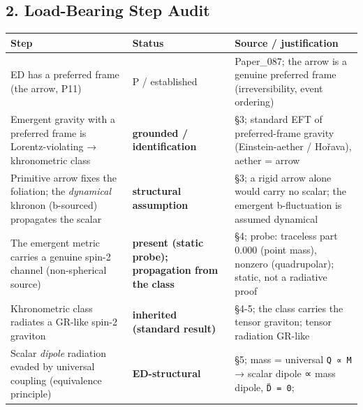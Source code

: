 \documentclass[
]{article}
\newcounter{none} %
\begin{document}
\subsection{2. Load-Bearing Step Audit}\label{load-bearing-step-audit}

{\def\LTcaptype{none} %
\begin{longtable}[]{@{}
  >{\raggedright\arraybackslash}p{}
  >{\raggedright\arraybackslash}p{}
  >{\raggedright\arraybackslash}p{}@{}}
\toprule\noalign{}
\begin{minipage}[b]{\linewidth}\raggedright
Step
\end{minipage} & \begin{minipage}[b]{\linewidth}\raggedright
Status
\end{minipage} & \begin{minipage}[b]{\linewidth}\raggedright
Source / justification
\end{minipage} \\
\midrule\noalign{}
\endhead
\bottomrule\noalign{}
\endlastfoot
ED has a preferred frame (the arrow, P11) & P / established &
Paper\_087; the arrow is a genuine preferred frame (irreversibility,
event ordering) \\
Emergent gravity with a preferred frame is Lorentz-violating →
khronometric class & \textbf{grounded / identification} & §3; standard
EFT of preferred-frame gravity (Einstein-aether / Hořava), aether =
arrow \\
Primitive arrow fixes the foliation; the \emph{dynamical} khronon
(b-sourced) propagates the scalar & \textbf{structural assumption} & §3;
a rigid arrow alone would carry no scalar; the emergent b-fluctuation is
assumed dynamical \\
The emergent metric carries a genuine spin-2 channel (non-spherical
source) & \textbf{present (static probe); propagation from the class} &
§4; probe: traceless part 0.000 (point mass), nonzero (quadrupolar);
static, not a radiative proof \\
Khronometric class radiates a GR-like spin-2 graviton &
\textbf{inherited (standard result)} & §4-5; the class carries the
tensor graviton; tensor radiation GR-like \\
Scalar \emph{dipole} radiation evaded by universal coupling (equivalence
principle) & \textbf{ED-structural} & §5; mass = universal
\texttt{Q\ ∝\ M} → scalar dipole ∝ mass dipole, \texttt{D̈\ =\ 0};

\end{longtable}}
\end{document}
